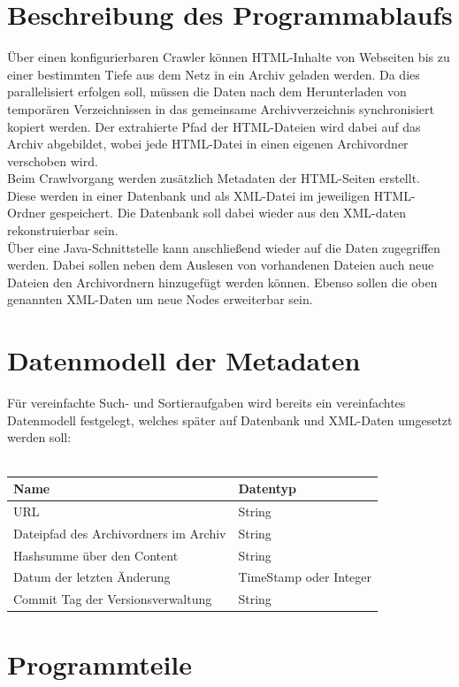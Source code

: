 \chapter{Beschreibung des Programmablaufs}
Über einen konfigurierbaren Crawler können HTML-Inhalte von Webseiten bis zu einer bestimmten Tiefe
aus dem Netz in ein Archiv geladen werden. Da dies parallelisiert erfolgen soll,
müssen die Daten nach dem Herunterladen von temporären Verzeichnissen in das gemeinsame
Archivverzeichnis synchronisiert kopiert werden. Der extrahierte Pfad der HTML-Dateien wird
dabei auf das Archiv abgebildet, wobei jede HTML-Datei in einen eigenen Archivordner verschoben wird. \\
Beim Crawlvorgang werden zusätzlich Metadaten der HTML-Seiten erstellt. 
Diese werden in einer Datenbank und als XML-Datei im jeweiligen HTML-Ordner gespeichert.
Die Datenbank soll dabei wieder aus den XML-daten rekonstruierbar sein. \\
Über eine Java-Schnittstelle kann anschließend wieder auf die Daten zugegriffen werden.
Dabei sollen neben dem Auslesen von vorhandenen Dateien auch neue Dateien den Archivordnern hinzugefügt werden können.
Ebenso sollen die oben genannten XML-Daten um neue Nodes erweiterbar sein.

\chapter{Datenmodell der Metadaten}
Für vereinfachte Such- und Sortieraufgaben wird bereits ein vereinfachtes Datenmodell festgelegt, welches
später auf Datenbank und XML-Daten umgesetzt werden soll: \\\\
\begin{tabular}{|l|l|}
	\hline
	Name & Datentyp \\
	\hline
	URL & String \\
	Dateipfad des Archivordners im Archiv & String \\
	Hashsumme über den Content &  String \\
	Datum der letzten Änderung & TimeStamp oder Integer \\
	Commit Tag der Versionsverwaltung & String \\
	\hline
\end{tabular}

\chapter{Programmteile}

